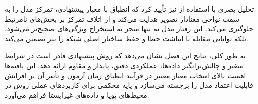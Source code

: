 تحلیل بصری با استفاده از  نیز تأیید کرد که انطباق با معیار پیشنهادی، تمرکز مدل را به سمت نواحی معنادار تصویر هدایت می‌کند و از اتلاف تمرکز بر بخش‌های نامرتبط جلوگیری می‌کند. این رفتار مدل نه تنها منجر به استخراج ویژگی‌های صحیح‌تر می‌شود، بلکه توانایی مقابله با انباشت خطا و حفظ ساختار اصلی شبکه را نیز تضمین می‌کند.

به طور کلی، نتایج این فصل نشان می‌دهد که روش پیشنهادی قادر است در شرایط متغیر و چالش‌برانگیز داده‌ها، عملکردی دقیق، پایدار و مقاوم ارائه دهد. این یافته‌ها اهمیت بالای انتخاب معیار معتبر در فرآیند انطباق زمان آزمون و تأثیر آن بر افزایش قابلیت اعتماد مدل را برجسته می‌سازد و پایه محکمی برای کاربردهای عملی روش در محیط‌های پویا و داده‌های غیرایستا فراهم می‌آورد.